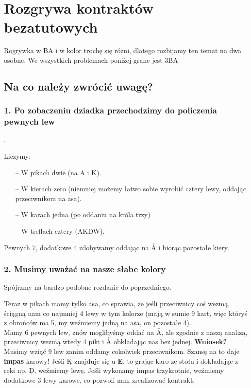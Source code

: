 \documentclass{article}
\begin{document}
\section*{Rozgrywa kontraktów bezatutowych}
Rogrywka w BA i w kolor trochę się różni, dlatego rozbijamy ten temat na dwa osobne. We wszystkich problemach poniżej
grane jest 3BA
\subsection*{Na co należy zwrócić uwagę?}
\subsubsection*{1. Po zobaczeniu dziadka przechodzimy do policzenia pewnych lew}.
\begin{quote}
 {}
\end{quote}
Liczymy:
\begin{itemize}
	\item[--] W pikach dwie (na A i K).
	\item[--] W kierach zero (niemniej możemy łatwo sobie wyrobić cztery lewy, oddając przeciwnikom na asa).
	\item[--] W karach jedna (po oddaniu na króla trzy)
	\item[--] W treflach cztery (AKDW).
\end{itemize}
Pewnych 7, dodatkowe 4 zdobywamy oddając na \h A i biorąc pozostałe kiery.
\subsubsection*{2. Musimy uważać na nasze słabe kolory}
Spójrzmy na bardzo podobne rozdanie do poprzedniego.
\begin{quote}
\end{quote}
Teraz w pikach mamy tylko asa, co sprawia, że jeśli przeciwnicy coś wezmą, ściągną nam co najmniej 4 lewy w tym kolorze
(mają w sumie 9 kart, więc któryś z obrońców ma 5, my weźmiemy jedną na asa, on pozostałe 4).\\
Mamy 6 pewnych lew, znów moglibyśmy oddać na \h A, ale zgodnie z naszą analizą, przeciwnicy wezmą wtedy 4 piki i \h A obkładając nas bez jednej.
\textbf{Wniosek?} Musimy wziąć 9 lew zanim oddamy cokolwiek przeciwnikom. Szansę na to daje \textbf{impas} karowy!
Jeśli \d K znajduje się u \textbf{E}, to grając karo ze stołu i dokładając z ręki np. \d D, weźmiemy lewę. Jeśli
wykonamy impas trzykrotnie, weźmiemy dodatkowe 3 lewy karowe, co pozwoli nam zrealizować kontrakt.
\end{document}
